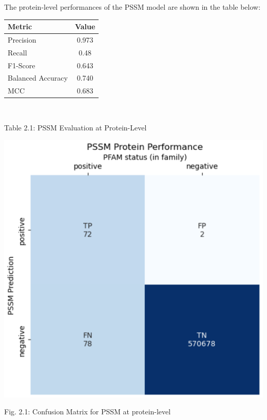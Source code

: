 \documentclass[10pt,twocolumn,letterpaper]{article}
\begin{document}
The protein-level performances of the PSSM model are shown in the table below:

\begin{center}
    \begin{tabular}{lc}
        \toprule
        Metric & Value \\
        \midrule
        Precision & 0.973 \\
        Recall & 0.48 \\
        F1-Score & 0.643 \\
        Balanced Accuracy & 0.740 \\
        MCC & 0.683 \\
        \bottomrule
    \end{tabular}
\end{center} \\ 

\begin{center}
    \small{Table 2.1: PSSM Evaluation at Protein-Level}
\end{center}


\begin{center}
    \includegraphics[scale=0.45]{report/img/pssm_prot_performance.png}
\end{center}

\begin{center}
    \small{Fig. 2.1: Confusion Matrix for PSSM at protein-level}
\end{center}
\end{document}
